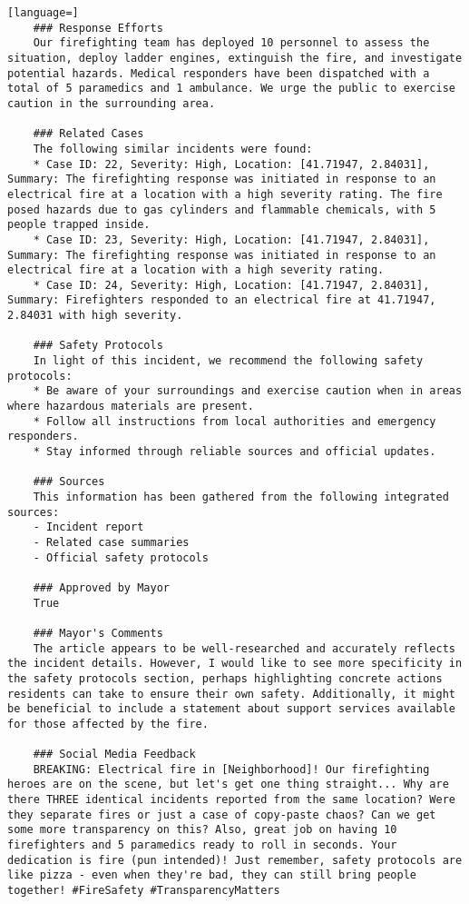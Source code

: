 \begin{lstlisting}[language=]
    ### Response Efforts
    Our firefighting team has deployed 10 personnel to assess the situation, deploy ladder engines, extinguish the fire, and investigate potential hazards. Medical responders have been dispatched with a total of 5 paramedics and 1 ambulance. We urge the public to exercise caution in the surrounding area.

    ### Related Cases
    The following similar incidents were found:
    * Case ID: 22, Severity: High, Location: [41.71947, 2.84031], Summary: The firefighting response was initiated in response to an electrical fire at a location with a high severity rating. The fire posed hazards due to gas cylinders and flammable chemicals, with 5 people trapped inside.
    * Case ID: 23, Severity: High, Location: [41.71947, 2.84031], Summary: The firefighting response was initiated in response to an electrical fire at a location with a high severity rating.
    * Case ID: 24, Severity: High, Location: [41.71947, 2.84031], Summary: Firefighters responded to an electrical fire at 41.71947, 2.84031 with high severity.

    ### Safety Protocols
    In light of this incident, we recommend the following safety protocols:
    * Be aware of your surroundings and exercise caution when in areas where hazardous materials are present.
    * Follow all instructions from local authorities and emergency responders.
    * Stay informed through reliable sources and official updates.

    ### Sources
    This information has been gathered from the following integrated sources:
    - Incident report
    - Related case summaries
    - Official safety protocols

    ### Approved by Mayor
    True

    ### Mayor's Comments
    The article appears to be well-researched and accurately reflects the incident details. However, I would like to see more specificity in the safety protocols section, perhaps highlighting concrete actions residents can take to ensure their own safety. Additionally, it might be beneficial to include a statement about support services available for those affected by the fire.

    ### Social Media Feedback
    BREAKING: Electrical fire in [Neighborhood]! Our firefighting heroes are on the scene, but let's get one thing straight... Why are there THREE identical incidents reported from the same location? Were they separate fires or just a case of copy-paste chaos? Can we get some more transparency on this? Also, great job on having 10 firefighters and 5 paramedics ready to roll in seconds. Your dedication is fire (pun intended)! Just remember, safety protocols are like pizza - even when they're bad, they can still bring people together! #FireSafety #TransparencyMatters

\end{lstlisting}

